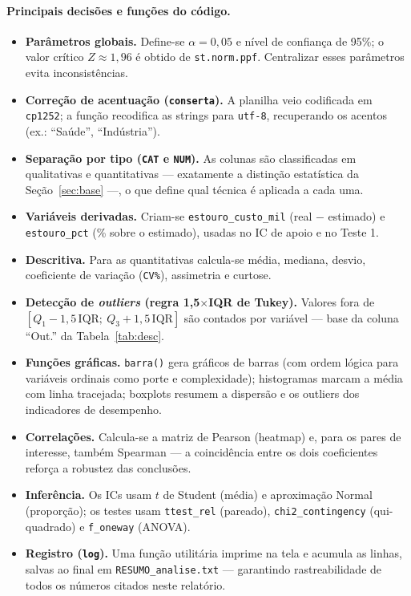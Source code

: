 \documentclass[a4paper, 12pt]{article}
\newcommand{\var}[1]{\texttt{#1}}
\begin{document}
\paragraph{Principais decisões e funções do código.}
\begin{itemize}[leftmargin=*]
	\item \textbf{Parâmetros globais.} Define-se $\alpha = 0{,}05$ e nível de
	      confiança de 95\%; o valor crítico $Z \approx 1{,}96$ é obtido de
	      \texttt{st.norm.ppf}. Centralizar esses parâmetros evita inconsistências.
	\item \textbf{Correção de acentuação (\texttt{conserta}).} A planilha veio
	      codificada em \texttt{cp1252}; a função recodifica as strings para
	      \texttt{utf-8}, recuperando os acentos (ex.: ``Saúde'', ``Indústria'').
	\item \textbf{Separação por tipo (\texttt{CAT} e \texttt{NUM}).} As colunas são
	      classificadas em qualitativas e quantitativas --- exatamente a distinção
	      estatística da Seção~\ref{sec:base} ---, o que define qual técnica é
	      aplicada a cada uma.
	\item \textbf{Variáveis derivadas.} Criam-se \var{estouro\_custo\_mil}
	      (real $-$ estimado) e \var{estouro\_pct} (\% sobre o estimado), usadas no
	      IC de apoio e no Teste 1.
	\item \textbf{Descritiva.} Para as quantitativas calcula-se média, mediana,
	      desvio, coeficiente de variação (\texttt{CV\%}), assimetria e curtose.
	\item \textbf{Detecção de \emph{outliers} (regra 1,5$\times$IQR de Tukey).}
	      Valores fora de $[Q_1 - 1{,}5\,\text{IQR};\ Q_3 + 1{,}5\,\text{IQR}]$ são
	      contados por variável --- base da coluna ``Out.'' da Tabela~\ref{tab:desc}.
	\item \textbf{Funções gráficas.} \texttt{barra()} gera gráficos de barras
	      (com ordem lógica para variáveis ordinais como porte e complexidade);
	      histogramas marcam a média com linha tracejada; boxplots resumem a
	      dispersão e os outliers dos indicadores de desempenho.
	\item \textbf{Correlações.} Calcula-se a matriz de Pearson (heatmap) e, para os
	      pares de interesse, também Spearman --- a coincidência entre os dois
	      coeficientes reforça a robustez das conclusões.
	\item \textbf{Inferência.} Os ICs usam $t$ de Student (média) e aproximação
	      Normal (proporção); os testes usam \texttt{ttest\_rel} (pareado),
	      \texttt{chi2\_contingency} (qui-quadrado) e \texttt{f\_oneway} (ANOVA).
	\item \textbf{Registro (\texttt{log}).} Uma função utilitária imprime na tela e
	      acumula as linhas, salvas ao final em \var{RESUMO\_analise.txt} ---
	      garantindo rastreabilidade de todos os números citados neste relatório.
\end{itemize}
\end{document}
